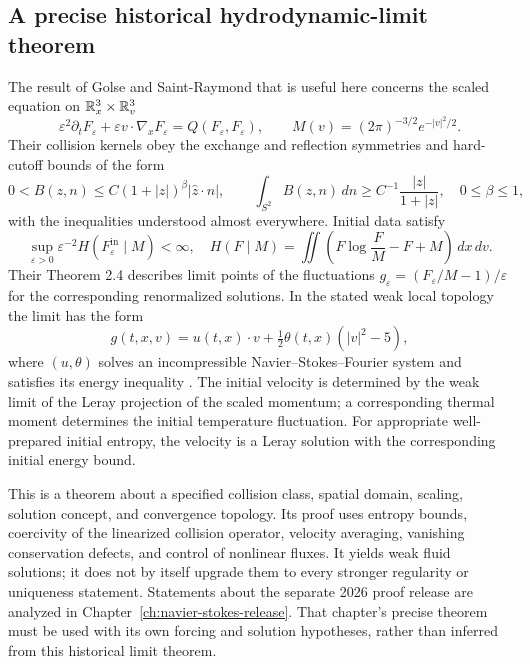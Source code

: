 \subsection{A precise historical hydrodynamic-limit theorem}

The result of Golse and Saint-Raymond that is useful here concerns
the scaled equation on $\mathbb{R}^3_x\times\mathbb{R}^3_v$
\begin{equation}
 \varepsilon^2\partial_tF_\varepsilon
 +\varepsilon v\cdot\nabla_xF_\varepsilon
 =Q(F_\varepsilon,F_\varepsilon),
 \qquad M(v)=(2\pi)^{-3/2}e^{-|v|^2/2}.
 \label{eq:micro-hydro-scale}
\end{equation}
Their collision kernels obey the exchange and reflection symmetries
and hard-cutoff bounds of the form
\[
 0<B(z,n)\le C(1+|z|)^\beta|\widehat z\cdot n|,
 \qquad
 \int_{S^2}B(z,n)\,dn\ge C^{-1}\frac{|z|}{1+|z|},
 \quad0\le\beta\le1,
\]
with the inequalities understood almost everywhere.  Initial data
satisfy
\begin{equation}
 \sup_{\varepsilon>0}\varepsilon^{-2}
 H(F^{\mathrm{in}}_\varepsilon\mid M)<\infty,
 \quad
 H(F\mid M)=\iint\left(F\log\frac FM-F+M\right)\,dx\,dv.
 \label{eq:micro-relative-scaling}
\end{equation}
Their Theorem 2.4 describes limit points of the fluctuations
$g_\varepsilon=(F_\varepsilon/M-1)/\varepsilon$ for the
corresponding renormalized solutions.  In the stated weak local
topology the limit has the form
\[
 g(t,x,v)=u(t,x)\cdot v+
            \tfrac12\theta(t,x)(|v|^2-5),
\]
where $(u,\theta)$ solves an incompressible
Navier--Stokes--Fourier system and satisfies its energy inequality
\citep[Theorem 2.4]{microGolseSaintRaymond2009}.
The initial velocity is determined by the weak limit of the Leray
projection of the scaled momentum; a corresponding thermal moment
determines the initial temperature fluctuation.  For appropriate
well-prepared initial entropy, the velocity is a Leray solution
with the corresponding initial energy bound.

This is a theorem about a specified collision class, spatial domain,
scaling, solution concept, and convergence topology.  Its proof uses
entropy bounds, coercivity of the linearized collision operator,
velocity averaging, vanishing conservation defects, and control of
nonlinear fluxes.  It yields weak fluid solutions; it does not by
itself upgrade them to every stronger regularity or uniqueness
statement.  Statements about the separate 2026 proof release are
analyzed in Chapter~\ref{ch:navier-stokes-release}.  That chapter's
precise theorem must be used with its own forcing and solution
hypotheses, rather than inferred from this historical limit theorem.


